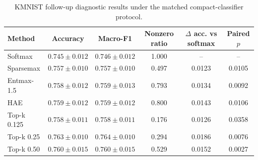 \begin{table}[!t]
\centering
\small
\caption{KMNIST follow-up diagnostic results under the matched compact-classifier protocol.}
\label{tab:kmnist-followup}
\begin{tabular}{@{}lccccc@{}}
\toprule
Method & Accuracy & Macro-F1 & Nonzero ratio & $\Delta$ acc. vs softmax & Paired $p$ \\
\midrule
Softmax & $0.745 \pm 0.012$ & $0.746 \pm 0.012$ & 1.000 & -- & -- \\
Sparsemax & $0.757 \pm 0.010$ & $0.757 \pm 0.010$ & 0.497 & 0.0123 & 0.0105 \\
Entmax-1.5 & $0.758 \pm 0.012$ & $0.759 \pm 0.013$ & 0.793 & 0.0134 & 0.0092 \\
HAE & $0.759 \pm 0.012$ & $0.759 \pm 0.012$ & 0.800 & 0.0143 & 0.0106 \\
Top-k 0.125 & $0.758 \pm 0.011$ & $0.758 \pm 0.011$ & 0.176 & 0.0126 & 0.0358 \\
Top-k 0.25 & $0.763 \pm 0.010$ & $0.764 \pm 0.010$ & 0.294 & 0.0186 & 0.0076 \\
Top-k 0.50 & $0.760 \pm 0.015$ & $0.760 \pm 0.015$ & 0.529 & 0.0152 & 0.0027 \\
\bottomrule
\end{tabular}
\end{table}

